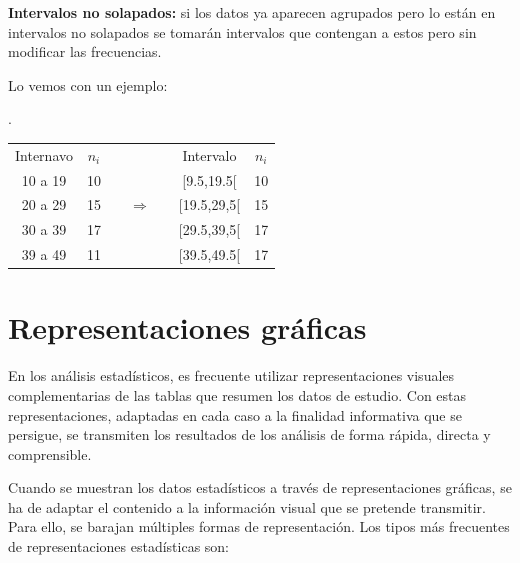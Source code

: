\textbf{Intervalos no solapados:} si los datos ya aparecen agrupados pero lo están en intervalos no solapados se tomarán intervalos que contengan a estos pero sin modificar las frecuencias.

Lo vemos con un ejemplo:

\begin{example}.
\begin{table}[H]
\centering
\begin{tabular}{c|ccc|c}
Internavo & $n_i$ & \multirow{5}{*}{$\quad \Rightarrow \quad$} & Intervalo   & $n_i$ \\ \cline{1-2} \cline{4-5} 
10 a 19   & 10    &                                            & [9.5,19.5[  & 10    \\
20 a 29   & 15    &                                            & [19.5,29,5[ & 15    \\
30 a 39   & 17    &                                            & [29.5,39,5[ & 17    \\
39 a 49   & 11    &                                            & [39.5,49.5[ & 17   
\end{tabular}
\end{table}
\end{example}

\section{Representaciones gráficas}


En los análisis estadísticos, es frecuente utilizar representaciones visuales complementarias de las tablas que resumen los datos de estudio. Con estas representaciones, adaptadas en cada caso a la finalidad informativa que se persigue, se transmiten los resultados de los análisis de forma rápida, directa y comprensible.

Cuando se muestran los datos estadísticos a través de representaciones gráficas, se ha de adaptar el contenido a la información visual que se pretende transmitir. Para ello, se barajan múltiples formas de representación. Los tipos más frecuentes de representaciones estadísticas son:

